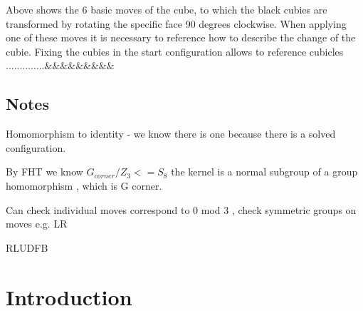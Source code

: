 \documentclass{article}
\begin{document}
\begin{figure}[h]
{
}
\end{figure}
\vspace{20pt}
\newline Above shows the 6 basic moves of the cube, to which the black cubies are transformed by rotating the specific face 90 degrees clockwise.  When applying one of these moves it is necessary to reference how to describe the change of the cubie. Fixing the cubies in the start configuration allows to reference cubicles ..............$\&\&\&\&\&\&\&\&\&$

 
\subsection{Notes}	
Homomorphism to identity - we know there is one because there is a solved configuration.\newline

By FHT we know $G_{corner}/Z_{3} <= S_{8}$ the kernel is a normal subgroup of a group homomorphism , which is G corner.\newline

Can check individual moves correspond to 0 mod 3 , check symmetric groups on moves e.g. LR

RLUDFB

\section{Introduction}
\end{document}
